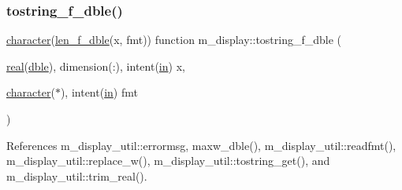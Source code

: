 \subsubsection{\texorpdfstring{tostring\+\_\+f\+\_\+dble()}{tostring\_f\_dble()}}
{\footnotesize\ttfamily \hyperlink{option__stopwatch_83_8txt_abd4b21fbbd175834027b5224bfe97e66}{character}(\hyperlink{namespacem__display_aa013a639d5b0f7e40b627c9d712693f0}{len\+\_\+f\+\_\+dble}(x, fmt)) function m\+\_\+display\+::tostring\+\_\+f\+\_\+dble (\begin{DoxyParamCaption}\item[{\hyperlink{read__watch_83_8txt_abdb62bde002f38ef75f810d3a905a823}{real}(\hyperlink{namespacem__display_a46d90b75b6ccef7ccade133e5847e815}{dble}), dimension(\+:), intent(\hyperlink{M__journal_83_8txt_afce72651d1eed785a2132bee863b2f38}{in})}]{x,  }\item[{\hyperlink{option__stopwatch_83_8txt_abd4b21fbbd175834027b5224bfe97e66}{character}($\ast$), intent(\hyperlink{M__journal_83_8txt_afce72651d1eed785a2132bee863b2f38}{in})}]{fmt }\end{DoxyParamCaption})\hspace{0.3cm}{\ttfamily [private]}}



References m\+\_\+display\+\_\+util\+::errormsg, maxw\+\_\+dble(), m\+\_\+display\+\_\+util\+::readfmt(), m\+\_\+display\+\_\+util\+::replace\+\_\+w(), m\+\_\+display\+\_\+util\+::tostring\+\_\+get(), and m\+\_\+display\+\_\+util\+::trim\+\_\+real().

